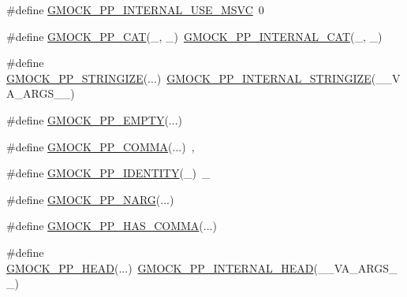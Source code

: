 \begin{DoxyCompactItemize}
\item 
\#define \mbox{\hyperlink{googletest-master_2googlemock_2include_2gmock_2internal_2gmock-pp_8h_a6d4eb33dd19ac1997d7585961e8cc576}{G\+M\+O\+C\+K\+\_\+\+P\+P\+\_\+\+I\+N\+T\+E\+R\+N\+A\+L\+\_\+\+U\+S\+E\+\_\+\+M\+S\+VC}}~0
\item 
\#define \mbox{\hyperlink{googletest-master_2googlemock_2include_2gmock_2internal_2gmock-pp_8h_a108c52ffa81ab99348d23b8fa76fded3}{G\+M\+O\+C\+K\+\_\+\+P\+P\+\_\+\+C\+AT}}(\+\_,  \+\_)~\mbox{\hyperlink{_obj__test_2lib_2googletest-master_2googlemock_2include_2gmock_2internal_2gmock-pp_8h_a2b034c776c832e3d951f5d123658a7ba}{G\+M\+O\+C\+K\+\_\+\+P\+P\+\_\+\+I\+N\+T\+E\+R\+N\+A\+L\+\_\+\+C\+AT}}(\+\_, \+\_)
\item 
\#define \mbox{\hyperlink{googletest-master_2googlemock_2include_2gmock_2internal_2gmock-pp_8h_a5e7b60e34a7bb66bac56c440f6aa52cb}{G\+M\+O\+C\+K\+\_\+\+P\+P\+\_\+\+S\+T\+R\+I\+N\+G\+I\+ZE}}(...)~\mbox{\hyperlink{_obj__test_2lib_2googletest-master_2googlemock_2include_2gmock_2internal_2gmock-pp_8h_afd092b75707cbc1efd7fe183c94afb79}{G\+M\+O\+C\+K\+\_\+\+P\+P\+\_\+\+I\+N\+T\+E\+R\+N\+A\+L\+\_\+\+S\+T\+R\+I\+N\+G\+I\+ZE}}(\+\_\+\+\_\+\+V\+A\+\_\+\+A\+R\+G\+S\+\_\+\+\_\+)
\item 
\#define \mbox{\hyperlink{googletest-master_2googlemock_2include_2gmock_2internal_2gmock-pp_8h_a7dc39000427944f011a62b2aa915fc2a}{G\+M\+O\+C\+K\+\_\+\+P\+P\+\_\+\+E\+M\+P\+TY}}(...)
\item 
\#define \mbox{\hyperlink{googletest-master_2googlemock_2include_2gmock_2internal_2gmock-pp_8h_a44870968c9989ec20c90812361e21a55}{G\+M\+O\+C\+K\+\_\+\+P\+P\+\_\+\+C\+O\+M\+MA}}(...)~,
\item 
\#define \mbox{\hyperlink{googletest-master_2googlemock_2include_2gmock_2internal_2gmock-pp_8h_a6123441ddc433915bfc8996a0a4eb397}{G\+M\+O\+C\+K\+\_\+\+P\+P\+\_\+\+I\+D\+E\+N\+T\+I\+TY}}(\+\_)~\+\_
\item 
\#define \mbox{\hyperlink{googletest-master_2googlemock_2include_2gmock_2internal_2gmock-pp_8h_a9db18220b88597a07704bc7cf3b13304}{G\+M\+O\+C\+K\+\_\+\+P\+P\+\_\+\+N\+A\+RG}}(...)
\item 
\#define \mbox{\hyperlink{googletest-master_2googlemock_2include_2gmock_2internal_2gmock-pp_8h_aaf83e01e56eb26d7eac9efb477587510}{G\+M\+O\+C\+K\+\_\+\+P\+P\+\_\+\+H\+A\+S\+\_\+\+C\+O\+M\+MA}}(...)
\item 
\#define \mbox{\hyperlink{googletest-master_2googlemock_2include_2gmock_2internal_2gmock-pp_8h_ad7910160dfc0fb20b239efcf1f3ddd85}{G\+M\+O\+C\+K\+\_\+\+P\+P\+\_\+\+H\+E\+AD}}(...)~\mbox{\hyperlink{_obj__test_2lib_2googletest-master_2googlemock_2include_2gmock_2internal_2gmock-pp_8h_a76a2c212a600bad8c26c34343785d070}{G\+M\+O\+C\+K\+\_\+\+P\+P\+\_\+\+I\+N\+T\+E\+R\+N\+A\+L\+\_\+\+H\+E\+AD}}(\+\_\+\+\_\+\+V\+A\+\_\+\+A\+R\+G\+S\+\_\+\+\_\+)

\end{DoxyCompactItemize}
